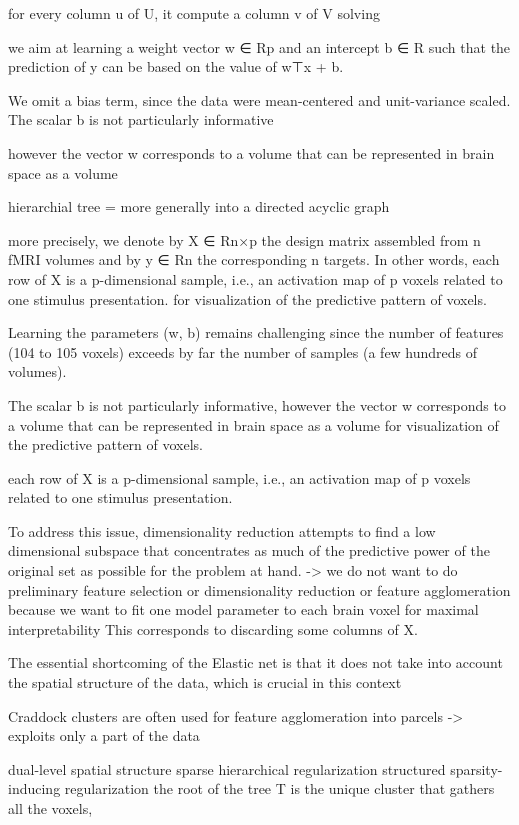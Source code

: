 \documentclass{article} %
\begin{document}
for every column u of U, it compute a column v of V solving

we aim at learning a weight vector w ∈ Rp and an intercept b ∈ R
such that the prediction of y can be based on the value of w⊤x + b.

We omit a bias term, since the data were mean-centered
and unit-variance scaled.
The scalar b is not particularly informative

however the vector w corresponds to a volume that
can be represented in brain space as a volume

hierarchial tree = more generally into a directed acyclic graph

more precisely, we denote by X ∈ Rn×p the design matrix
assembled from n fMRI volumes and by y ∈ Rn the corresponding n targets.
In other words, each row of X is a p-dimensional sample,
i.e., an activation map of p voxels related to one stimulus presentation.
for visualization of the predictive pattern of voxels. 

Learning the parameters (w, b) remains challenging
since the number of features (104 to 105 voxels) exceeds
by far the number of samples (a few hundreds of volumes). 

The scalar b is not particularly informative,
however the vector w corresponds to a volume that
can be represented in brain space as a volume
for visualization of the predictive pattern of voxels.

each row of X is a p-dimensional sample,
i.e., an activation map of p voxels related to one stimulus presentation.

To address this issue, dimensionality reduction attempts to
find a low dimensional subspace that concentrates
as much of the predictive power of
the original set as possible for the problem at hand.
-> we do not want to do preliminary feature selection or
dimensionality reduction
or feature agglomeration because we want to fit one model parameter
to each brain voxel for maximal interpretability
This corresponds to discarding some columns of X.

The essential shortcoming of the Elastic net is that
it does not take into account the spatial structure of the data,
which is crucial in this context

Craddock clusters are often used for feature agglomeration
into parcels
-> exploits only a part of the data

dual-level spatial structure
sparse hierarchical regularization
structured sparsity-inducing regularization
the root of the tree T is the unique cluster that gathers all the voxels,
\end{document}
